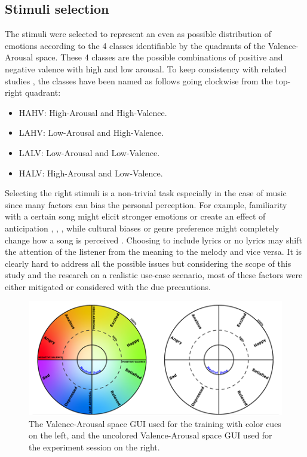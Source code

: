 \subsection{Stimuli selection}
\label{sec:stimuli}
The stimuli were selected to represent an even as possible distribution of emotions according to the 4 classes identifiable by the quadrants of the Valence-Arousal space. These 4 classes are the possible combinations of positive and negative valence with high and low arousal. To keep consistency with related studies \cite{koelstra_deap_2012}, the classes have been named as follows going clockwise from the top-right quadrant:
\begin{itemize}
\item HAHV: High-Arousal and High-Valence.
\item LAHV: Low-Arousal and High-Valence.
\item LALV: Low-Arousal and Low-Valence.
\item HALV: High-Arousal and Low-Valence.
\end{itemize}
Selecting the right stimuli is a non-trivial task especially in the case of music since many factors can bias the personal perception. For example, familiarity with a certain song might elicit stronger emotions or create an effect of anticipation \cite{sangnark_revealing_2021}, \cite{ward_same_2013}, \cite{salimpoor_anatomically_2011}, while cultural biases or genre preference might completely change how a song is perceived \cite{chang_personalized_2017,fang_perception_2017}. Choosing to include lyrics or no lyrics may shift the attention of the listener from the meaning to the melody and vice versa. It is clearly hard to address all the possible issues but considering the scope of this study and the research on a realistic use-case scenario, most of these factors were either mitigated or considered with the due precautions. 

\begin{figure}[h!]
\includegraphics[width=12cm]{img/methods/va_space_experiment.png}
\centering
\caption{The Valence-Arousal space GUI used for the training with color cues on the left, and the uncolored Valence-Arousal space GUI used for the experiment session on the right.} \label{fig_va_space_experiment}
\end{figure}

